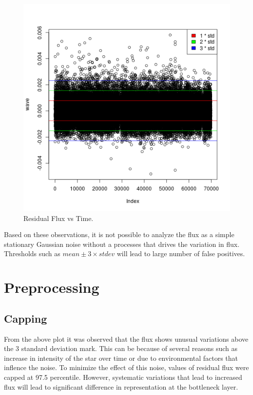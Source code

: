 \documentclass[%
aip,
amsmath,amssymb,
reprint,%
]{revtex4-1}
\begin{document}
\begin{figure}[h!]
	\includegraphics[width=\linewidth]{example.png}
	\caption{Residual Flux vs Time.}
	\label{fig:res_flux}
\end{figure}

Based on these observations, it is not possible to analyze the flux as a simple stationary Gaussian noise without a processes that drives the variation in flux. Thresholds such as $mean \pm 3 \times stdev$ will lead to large number of false positives.

\section{Preprocessing}

\subsection{Capping}

From the above plot it was observed that the flux shows unusual variations above the 3 standard deviation mark. This can be because of several reasons such as increase in intensity of the star over time or due to environmental factors that inflence the noise. To minimize the effect of this noise, values of residual flux were capped at 97.5 percentile. However, systematic variations that lead to increased flux will lead to significant difference in representation at the bottleneck layer.
\end{document}
